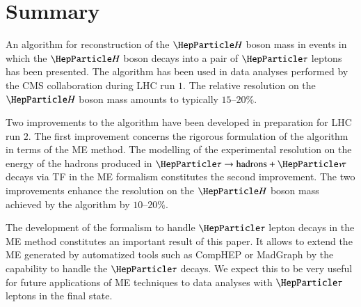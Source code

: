 \section{Summary}
\label{sec:summary}

An algorithm for reconstruction of the $\PHiggs$ boson mass in events
in which the $\PHiggs$ boson decays into a pair of $\Pgt$ leptons has been
presented.
The algorithm has been used in data analyses performed by the CMS
collaboration during LHC run $1$.
The relative resolution on the $\PHiggs$ boson mass amounts to typically
$15$--$20\%$.

Two improvements to the algorithm have been developed in preparation
for LHC run $2$.
The first improvement concerns the rigorous formulation of the
algorithm in terms of the ME method.
The modelling of the experimental resolution on the energy of the
hadrons produced in $\Pgt \to \textrm{hadrons} + \Pnut$ decays via TF in the ME
formalism constitutes the second improvement.
The two improvements enhance the resolution on the $\PHiggs$ boson mass
achieved by the algorithm by $10$--$20\%$.

The development of the formalism to handle $\Pgt$ lepton decays
in the ME method constitutes an important result of this paper.
It allows to extend the ME generated by automatized tools such as
CompHEP or MadGraph by the capability to handle the
$\Pgt$ decays. We expect this to be very useful for future
applications of ME techniques to data analyses with $\Pgt$ leptons in
the final state. 